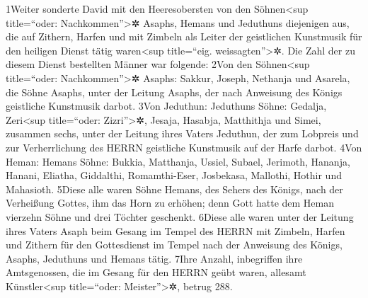 1Weiter sonderte David mit den Heeresobersten von den
Söhnen\textless sup title=``oder: Nachkommen''\textgreater✲ Asaphs,
Hemans und Jeduthuns diejenigen aus, die auf Zithern, Harfen und mit
Zimbeln als Leiter der geistlichen Kunstmusik für den heiligen Dienst
tätig waren\textless sup title=``eig. weissagten''\textgreater✲. Die
Zahl der zu diesem Dienst bestellten Männer war folgende: 2Von den
Söhnen\textless sup title=``oder: Nachkommen''\textgreater✲ Asaphs:
Sakkur, Joseph, Nethanja und Asarela, die Söhne Asaphs, unter der
Leitung Asaphs, der nach Anweisung des Königs geistliche Kunstmusik
darbot. 3Von Jeduthun: Jeduthuns Söhne: Gedalja, Zeri\textless sup
title=``oder: Zizri''\textgreater✲, Jesaja, Hasabja, Matthithja und
Simei, zusammen sechs, unter der Leitung ihres Vaters Jeduthun, der zum
Lobpreis und zur Verherrlichung des HERRN geistliche Kunstmusik auf der
Harfe darbot. 4Von Heman: Hemans Söhne: Bukkia, Matthanja, Ussiel,
Subael, Jerimoth, Hananja, Hanani, Eliatha, Giddalthi, Romamthi-Eser,
Josbekasa, Mallothi, Hothir und Mahasioth. 5Diese alle waren Söhne
Hemans, des Sehers des Königs, nach der Verheißung Gottes, ihm das Horn
zu erhöhen; denn Gott hatte dem Heman vierzehn Söhne und drei Töchter
geschenkt. 6Diese alle waren unter der Leitung ihres Vaters Asaph beim
Gesang im Tempel des HERRN mit Zimbeln, Harfen und Zithern für den
Gottesdienst im Tempel nach der Anweisung des Königs, Asaphs, Jeduthuns
und Hemans tätig. 7Ihre Anzahl, inbegriffen ihre Amtsgenossen, die im
Gesang für den HERRN geübt waren, allesamt Künstler\textless sup
title=``oder: Meister''\textgreater✲, betrug 288.

